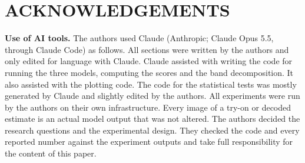 \section*{\uppercase{Acknowledgements}}

\noindent\textbf{Use of AI tools.} The authors used Claude (Anthropic; Claude Opus 5.5, through Claude Code) as follows. All sections were written by the authors and only edited for language with Claude. Claude assisted with writing the code for running the three models, computing the scores and the band decomposition. It also assisted with the plotting code. The code for the statistical tests was mostly generated by Claude and slightly edited by the authors. All experiments were run by the authors on their own infrastructure. Every image of a try-on or decoded estimate is an actual model output that was not altered. The authors decided the research questions and the experimental design. They checked the code and every reported number against the experiment outputs and take full responsibility for the content of this paper.
